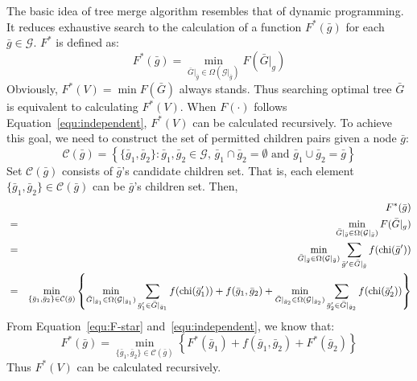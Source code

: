 The basic idea of tree merge algorithm resembles that of dynamic programming. It reduces
exhaustive search to the calculation of a function $F^*(\bar{g})$ for each $\bar{g}\in\mathcal{G}$.
$F^*$ is defined as:
\begin{equation}\label{equ:F-star}
F^*(\bar{g}) = \min_{\bar{G}|_{\bar{g}}\in\Omega(\mathcal{G}|_{\bar{g}})} F(\bar{G}|_{g})
\end{equation}
Obviously, $F^*(V) = \min F(\bar{G})$ always stands. Thus searching optimal tree $\bar{G}$
is equivalent to calculating $F^*(V)$. When $F(\cdot)$ follows Equation~\ref{equ:independent},
$F^*(V)$ can be calculated recursively. To achieve this goal, we need to construct
the set of permitted children pairs given a node $\bar{g}$:
\begin{equation}\label{equ:C-set}
\mathcal{C}(\bar{g}) = \left\{\{\bar{g}_1,\bar{g}_2\}:\mbox{$\bar{g}_1,\bar{g}_2\in\mathcal{G}$, $\bar{g}_1\cap\bar{g}_2=\emptyset$ and $\bar{g}_1\cup\bar{g}_2=\bar{g}$}\right\}
\end{equation}
Set $\mathcal{C}(\bar{g})$ consists of $\bar{g}$'s candidate children set. That is,
each element $\{\bar{g}_1,\bar{g}_2\}\in\mathcal{C}(\bar{g})$ can be $\bar{g}$'s children set. Then,
\begin{eqnarray*}
&&F^*(\bar{g})\\
&=& \min_{\bar{G}|_{\bar{g}}\in\Omega(\mathcal{G}|_{\bar{g}})} F(\bar{G}|_{g})\\
&=& \min_{\bar{G}|_{\bar{g}}\in\Omega(\mathcal{G}|_{\bar{g}})}\sum_{\bar{g}'\in \bar{G}|_{\bar{g}}}f(\mathrm{chi}(\bar{g}')) \\
&=& \min_{\{\bar{g}_1,\bar{g}_2\}\in\mathcal{C}(\bar{g})}\left\{
	\min_{\bar{G}|_{\bar{g}_1}\in\Omega(\mathcal{G}|_{\bar{g}_1})}\sum_{\bar{g}'_1\in \bar{G}|_{\bar{g}_1}}f(\mathrm{chi}(\bar{g}'_1))
	+ f(\bar{g}_1,\bar{g}_2)
	+ \min_{\bar{G}|_{\bar{g}_2}\in\Omega(\mathcal{G}|_{\bar{g}_2})}\sum_{\bar{g}'_2\in \bar{G}|_{\bar{g}_2}}f(\mathrm{chi}(\bar{g}'_2))\right\}
\end{eqnarray*}
From Equation~\ref{equ:F-star} and~\ref{equ:independent}, we know that:
\begin{equation}\label{equ:cal-F-star}
F^*(\bar{g}) = \min_{\{\bar{g}_1,\bar{g}_2\}\in\mathcal{C}(\bar{g})}\left\{F^*(\bar{g}_1)+f(\bar{g}_1,\bar{g}_2)+F^*(\bar{g}_2)\right\}
\end{equation}
Thus $F^*(V)$ can be calculated recursively.

